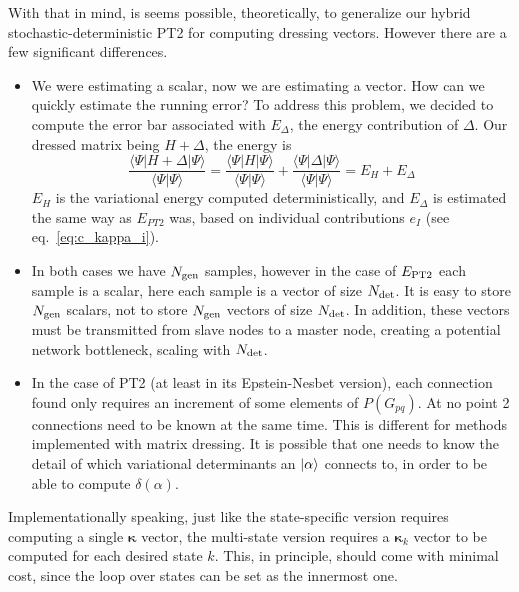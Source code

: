 \documentclass[./thesis.tex]{subfiles}
\begin{document}
With that in mind, is seems possible, theoretically, to generalize our hybrid stochastic-deterministic PT2 for computing dressing vectors.
However there are a few significant differences.
\begin{itemize}
\item
We were estimating a scalar, now we are estimating a vector. How can we quickly estimate the running error?
To address this problem, we decided to compute the error bar associated with $E_{\Delta}$, the energy contribution of $\Delta$. Our dressed matrix being $H + \Delta$, the energy is
\begin{equation}
\frac{\langle \Psi |H + \Delta | \Psi\rangle}{\langle \Psi | \Psi \rangle} = \frac{\langle \Psi |H  | \Psi\rangle}{\langle \Psi | \Psi \rangle} + \frac{\langle \Psi |\Delta | \Psi\rangle}{\langle \Psi | \Psi \rangle} = E_H + E_{\Delta} 
\end{equation}
$E_H$ is the variational energy computed deterministically, and $E_{\Delta}$ is estimated the same way as $E_{PT2}$ was, based on individual contributions $e_I$ (see eq.~\eqref{eq:c_kappa_i}).
\item
In both cases we have ${N_\text{gen}}$ samples, however in the case of $E_\text{PT2}$ each sample is a scalar, here each sample is a vector of size ${N_\text{det}}$. It is easy to store ${N_\text{gen}}$ scalars, not to store ${N_\text{gen}}$ vectors of size ${N_\text{det}}$. In addition, these vectors must be transmitted from slave nodes to a master node, creating a potential network bottleneck, scaling with ${N_\text{det}}$.
\item
In the case of PT2 (at least in its Epstein-Nesbet version), each connection found only requires an increment of some elements of $P(G_{pq})$. At no point 2 connections need to be known at the same time. This is different for methods implemented with matrix dressing. It is possible that one needs to know the detail of which variational determinants an $\ket \alpha$ connects to, in order to be able to compute $\delta(\alpha)$.
\end{itemize}



Implementationally speaking, just like the state-specific version requires computing a single ${\pmb \kappa}$ vector, the multi-state version requires a ${\pmb \kappa}_k$ vector to be computed for each desired state $k$. This, in principle, should come with minimal cost, since the loop over states can be set as the innermost one.

\end{document}
